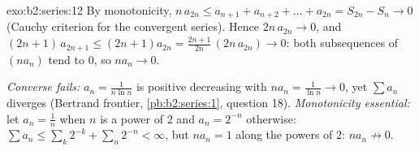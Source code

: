 \begin{solution}{exo:b2:series:12}
By monotonicity, $n\,a_{2n} \leq a_{n+1} + a_{n+2} + \dots +
a_{2n} = S_{2n} - S_n \to 0$ (Cauchy criterion for the
convergent series). Hence $2n\,a_{2n} \to 0$, and $(2n{+}1)\,
a_{2n+1} \leq (2n{+}1)a_{2n} = \frac{2n+1}{2n}\,(2n\,a_{2n}) \to
0$: both subsequences of $(na_n)$ tend to $0$, so $na_n \to 0$.

\emph{Converse fails:} $a_n = \frac1{n\ln n}$ is positive
decreasing with $na_n = \frac1{\ln n} \to 0$, yet $\sum a_n$
diverges (Bertrand frontier, \cref{pb:b2:series:1}, question
18). \emph{Monotonicity essential:} let $a_n = \frac1n$ when $n$
is a power of $2$ and $a_n = 2^{-n}$ otherwise: $\sum a_n \leq
\sum_k 2^{-k} + \sum_n 2^{-n} < \infty$, but $na_n = 1$ along
the powers of $2$: $na_n \not\to 0$.
\end{solution}

